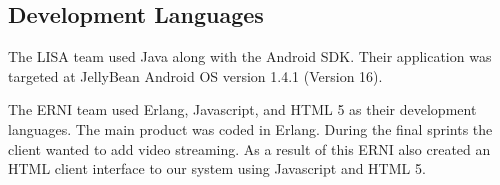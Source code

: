 \subsection{Development Languages}

The LISA team used Java along with the Android SDK. Their application was targeted at JellyBean Android OS version 1.4.1 (Version 16).

The ERNI team used Erlang, Javascript, and HTML 5  as their development languages. The main product was coded in Erlang. During the final sprints the client wanted to add video streaming. As a result of this ERNI also created an HTML client interface to our system using Javascript and HTML 5. 
